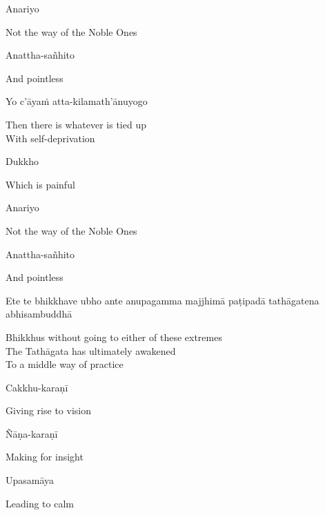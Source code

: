 Anariyo

\begin{english}
  Not the way of the Noble Ones
\end{english}

Anattha-sañhito

\begin{english}
  And pointless
\end{english}

Yo c'āyaṁ atta-kilamath'ānuyogo

\begin{english}
  Then there is whatever is tied up\\
  With self-deprivation
\end{english}

Dukkho

\begin{english}
  Which is painful
\end{english}

Anariyo

\begin{english}
  Not the way of the Noble Ones
\end{english}

Anattha-sañhito

\begin{english}
  And pointless
\end{english}

\begin{pali-hang}
  Ete te bhikkhave ubho ante anupagamma majjhimā paṭipadā tathāgatena abhisambuddhā
\end{pali-hang}

\begin{english-verses}
  Bhikkhus without going to either of these extremes\\
  The Tathāgata has ultimately awakened\\
  To a middle way of practice
\end{english-verses}

Cakkhu-karaṇī

\begin{english}
  Giving rise to vision
\end{english}

Ñāṇa-karaṇī

\begin{english}
  Making for insight
\end{english}

Upasamāya

\begin{english}
  Leading to calm
\end{english}

